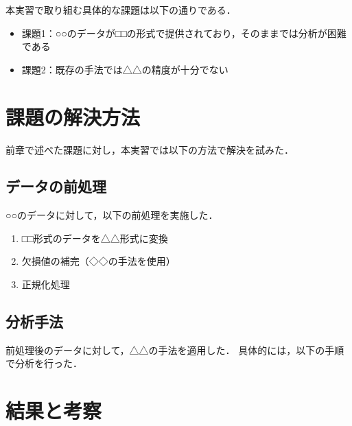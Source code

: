 \documentclass[submit,techrep,noauthor]{ipsj}
\begin{document}
本実習で取り組む具体的な課題は以下の通りである．

\begin{itemize}
\item 課題1：○○のデータが□□の形式で提供されており，そのままでは分析が困難である
\item 課題2：既存の手法では△△の精度が十分でない
\end{itemize}

\section{課題の解決方法}
\label{sec:method}


前章で述べた課題に対し，本実習では以下の方法で解決を試みた．

\subsection{データの前処理}

○○のデータに対して，以下の前処理を実施した．

\begin{enumerate}
\item □□形式のデータを△△形式に変換
\item 欠損値の補完（◇◇の手法を使用）
\item 正規化処理
\end{enumerate}

\subsection{分析手法}

前処理後のデータに対して，△△の手法を適用した．
具体的には，以下の手順で分析を行った．


\section{結果と考察}
\label{sec:result}
\end{document}
